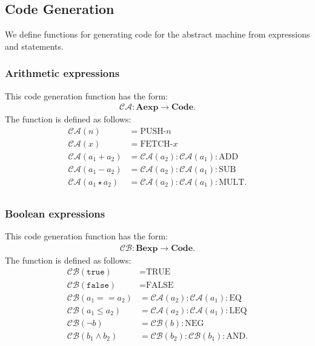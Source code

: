 \documentclass[a4paper, 12pt, twoside]{article}
\begin{document}
\newpage

\subsection{Code Generation}

We define functions for generating code for the abstract machine from
expressions and statements.

\subsubsection{Arithmetic expressions}

This code generation function has the form: \begin{gather*}
  \mathcal{CA} : \textbf{Aexp} \to \textbf{Code}.
\end{gather*} The function is defined as follows: \begin{align*}
  \mathcal{CA}(n) &= \text{PUSH-}n\\
  \mathcal{CA}(x) &= \text{FETCH-}x\\
  \mathcal{CA}(a_1 + a_2) &= \mathcal{CA}(a_2):\mathcal{CA}(a_1):\text{ADD}\\
  \mathcal{CA}(a_1 - a_2) &= \mathcal{CA}(a_2):\mathcal{CA}(a_1):\text{SUB}\\
  \mathcal{CA}(a_1 \star a_2) &= \mathcal{CA}(a_2):\mathcal{CA}(a_1):\text{MULT}.\\
\end{align*}

\subsubsection{Boolean expressions}

This code generation function has the form: \begin{gather*}
  \mathcal{CB} : \textbf{Bexp} \to \textbf{Code}.
\end{gather*} The function is defined as follows: \begin{align*}
  \mathcal{CB}(\texttt{true}) &= \text{TRUE}\\
  \mathcal{CB}(\texttt{false}) &= \text{FALSE}\\
  \mathcal{CB}(a_1 == a_2) &= \mathcal{CA}(a_2):\mathcal{CA}(a_1):\text{EQ}\\
  \mathcal{CB}(a_1 \leq a_2) &= \mathcal{CA}(a_2):\mathcal{CA}(a_1):\text{LEQ}\\
  \mathcal{CB}(\neg b) &= \mathcal{CB}(b):\text{NEG}\\
  \mathcal{CB}(b_1 \land b_2) &= \mathcal{CB}(b_2):\mathcal{CB}(b_1):\text{AND}.\\
\end{align*}
\end{document}
